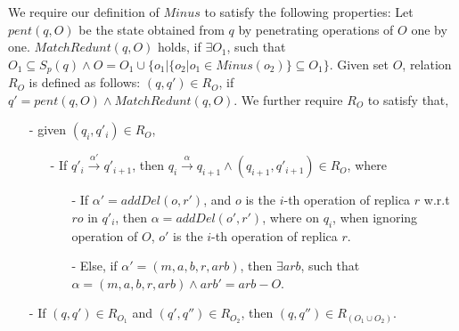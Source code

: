 We require our definition of $Minus$ to satisfy the following properties: Let $pent(q,O)$ be the state obtained from $q$ by penetrating operations of $O$ one by one. $MatchRedunt(q,O)$ holds, if $\exists O_1$, such that $O_1 \subseteq S_p(q) \wedge O = O_1 \cup \{ o_1 \vert  \{ o_2 \vert o_1 \in Minus(o_2) \} \subseteq O_1 \}$. Given set $O$, relation $R_{O}$ is defined as follows: $(q,q') \in R_{O}$, if $q' = pent(q,O) \wedge MatchRedunt(q,O)$. We further require $R_{O}$ to satisfy that,

\begin{itemize}
\setlength{\itemsep}{0.5pt}
\item[-] given $(q_i,q'_i) \in R_{O}$,

    \begin{itemize}
    \setlength{\itemsep}{0.5pt}




    \item[-] If $q'_i {\xrightarrow{\alpha'}} q'_{i+1}$, then $q_i {\xrightarrow{\alpha}} q_{i+1} \wedge (q_{i+1},q'_{i+1}) \in R_{O}$, where

        \begin{itemize}
        \setlength{\itemsep}{0.5pt}
        \item[-] If $\alpha' = addDel(o,r')$, and $o$ is the $i$-th operation of replica $r$ w.r.t $ro$ in $q'_i$, then $\alpha = addDel(o',r')$, where on $q_i$, when ignoring operation of $O$, $o'$ is the $i$-th operation of replica $r$. 

        \item[-] Else, if $\alpha'=(m,a,b,r,arb)$, then $\exists arb$, such that $\alpha=(m,a,b,r,arb) \wedge arb' = arb - O$.
        \end{itemize}
    \end{itemize}

\item[-] If $(q,q') \in R_{ O_1 }$ and $(q',q'') \in R_{ O_2 }$, then $(q,q'') \in R_{ ( O_1 \cup O_2 ) }$.
\end{itemize}


